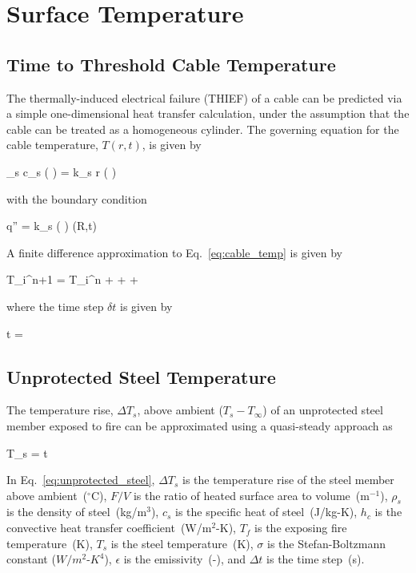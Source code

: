 \chapter{Surface Temperature}

\section{Time to Threshold Cable Temperature}

The thermally-induced electrical failure (THIEF) of a cable can be predicted via a simple
one-dimensional heat transfer calculation, under the assumption that the cable can be
treated as a homogeneous cylinder. The governing equation for the cable temperature,
$T(r,t)$, is given by

\be
\rho_s c_s \left(  \right) =   k_s r \left(  \right)
\label{eq:cable_temp}
\ee

\noindent with the boundary condition

\be
\dot q'' = k_s \left(  \right) (R,t)
\ee

\noindent A finite difference approximation to Eq.~\ref{eq:cable_temp} is given by

\be
T_i^{n+1} = T_i^n +  +  + 
\ee

\noindent where the time step $\delta t$ is given by

\be
\delta t = 
\ee


\clearpage


\section{Unprotected Steel Temperature}

The temperature rise, $\Delta T_s$, above ambient ($T_s - T_\infty$) of an unprotected steel member exposed to fire can be approximated using a quasi-steady approach as

\be
\Delta T_s =    \Delta t
\label{eq:unprotected_steel}
\ee

In Eq.~\ref{eq:unprotected_steel}, $\Delta T_s$ is the temperature rise of the steel member above ambient~($^\circ$C), $F/V$ is the ratio of heated surface area to volume~(m$^{-1}$), $\rho_s$ is the density of steel~(kg/m$^3$), $c_s$ is the specific heat of steel~(J/kg-K), $h_c$ is the convective heat transfer coefficient~(W/m$^2$-K), $T_f$ is the exposing fire temperature~(K), $T_s$ is the steel temperature~(K), $\sigma$ is the Stefan-Boltzmann constant ($W/m^2$-$K^4$), $\epsilon$ is the emissivity~(-), and $\Delta t$ is the time step~(s).

